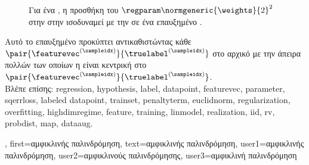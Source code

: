 {{\begin{figure}[H]
\begin{center}
			{
			\caption{\foreignlanguage{greek}{Για ένα} , \foreignlanguage{greek}{η προσθήκη του} 
				 $\regparam \normgeneric{\weights}{2}^2$ \foreignlanguage{greek}{στην}  
				\foreignlanguage{greek}{στην}  \foreignlanguage{greek}{ισοδυναμεί με την}  
				\foreignlanguage{greek}{σε ένα επαυξημένο} .  \label{fig_ridge_regression_dict} } }
			\end{center}
		\end{figure} 
		\foreignlanguage{greek}{Αυτό το επαυξημένο}  \foreignlanguage{greek}{προκύπτει αντικαθιστώντας κάθε} 
		 $\pair{\featurevec^{(\sampleidx)}}{\truelabel^{(\sampleidx)}}$ \foreignlanguage{greek}{στο αρχικό} 
		 \foreignlanguage{greek}{με την}  \foreignlanguage{greek}{άπειρα πολλών} 
		  \foreignlanguage{greek}{των οποίων η}  \foreignlanguage{greek}{είναι 
		κεντρική στο} $\pair{\featurevec^{(\sampleidx)}}{\truelabel^{(\sampleidx)}}$.
		\\
	    	\foreignlanguage{greek}{Βλέπε επίσης:} \gls{regression}, \gls{hypothesis}, \gls{label}, \gls{datapoint}, \gls{featurevec}, 
		\gls{parameter}, \gls{sqerrloss}, \gls{labeled datapoint}, \gls{trainset}, \gls{penaltyterm}, \gls{euclidnorm}, \gls{regularization}, \gls{overfitting}, 
		\gls{highdimregime}, \gls{feature}, \gls{training}, \gls{linmodel}, \gls{realization}, \gls{iid}, \gls{rv}, \gls{probdist}, \gls{map}, \gls{dataaug}. },
	    first={\foreignlanguage{greek}{αμφικλινής παλινδρόμηση}},
	    text={\foreignlanguage{greek}{αμφικλινής παλινδρόμηση}},
	    user1={\foreignlanguage{greek}{αμφικλινής παλινδρόμηση}}, %
	    user2={\foreignlanguage{greek}{αμφικλινούς παλινδρόμησης}}, %
	    user3={\foreignlanguage{greek}{αμφικλινή παλινδρόμηση}} %
}

